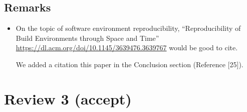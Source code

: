 \documentclass[%
	11pt,
	final,
]{article}
\begin{document}
\subsection{Remarks}

\begin{itemize}
\item On the topic of software environment reproducibility, ``Reproducibility of Build Environments through Space and Time'' \url{https://dl.acm.org/doi/10.1145/3639476.3639767} would be good to cite.
  \begin{review-answer}
    We added a citation this paper in the Conclusion section (Reference [25]).
  \end{review-answer}
\end{itemize}


\section{Review 3 (accept)}
\end{document}

